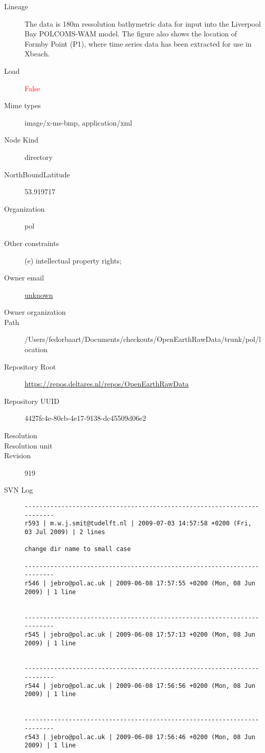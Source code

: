 \documentclass[9]{report}
\begin{document}
\begin{description}
  \item[Lineage] The data is 180m ressolution bathymetric data for input into the Liverpool Bay POLCOMS-WAM model.  The figure also shows the location of Formby Point (P1), where time series data has been extracted for use in Xbeach.
  \item[Load] \textcolor{red}{False}
  \item[Mime types] image/x-ms-bmp, application/xml
  \item[Node Kind] directory
  \item[NorthBoundLatitude] 53.919717
  \item[Organization] pol
  \item[Other constraints] (e) intellectual property rights;
  \item[Owner email] \href{mailto:unknown}{unknown}
  \item[Owner organization] 
  \item[Path] /Users/fedorbaart/Documents/checkouts/OpenEarthRawData/trunk/pol/location
  \item[Repository Root] \href{https://repos.deltares.nl/repos/OpenEarthRawData}{https://repos.deltares.nl/repos/OpenEarthRawData}
  \item[Repository UUID] 4427fc4e-80cb-4e17-9138-dc45509d06e2
  \item[Resolution] 
  \item[Resolution unit] 
  \item[Revision] 919
  \item[SVN Log] \begin{verbatim}
------------------------------------------------------------------------
r593 | m.w.j.smit@tudelft.nl | 2009-07-03 14:57:58 +0200 (Fri, 03 Jul 2009) | 2 lines

change dir name to small case

------------------------------------------------------------------------
r546 | jebro@pol.ac.uk | 2009-06-08 17:57:55 +0200 (Mon, 08 Jun 2009) | 1 line


------------------------------------------------------------------------
r545 | jebro@pol.ac.uk | 2009-06-08 17:57:13 +0200 (Mon, 08 Jun 2009) | 1 line


------------------------------------------------------------------------
r544 | jebro@pol.ac.uk | 2009-06-08 17:56:56 +0200 (Mon, 08 Jun 2009) | 1 line


------------------------------------------------------------------------
r543 | jebro@pol.ac.uk | 2009-06-08 17:56:46 +0200 (Mon, 08 Jun 2009) | 1 line



\end{verbatim}
\end{description}
\end{document}
